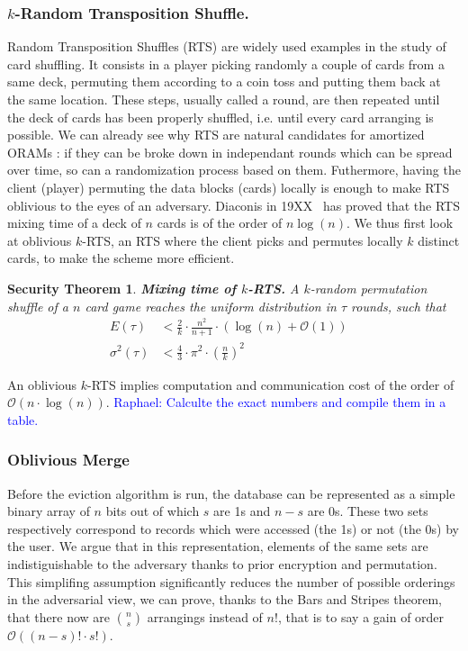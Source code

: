 \documentclass[conference]{IEEEtran}
\newtheorem{secthm}{Security Theorem}
\newcommand{\raphael}[1]{\textcolor{blue}{Raphael: #1}}
\begin{document}
\subsubsection{$k$-Random Transposition Shuffle.}
Random Transposition Shuffles (RTS) are widely used examples in the study of card shuffling. It consists in a player picking randomly a couple of cards from a same deck, permuting them according to a coin toss and putting them back at the same location.
These steps, usually called a round, are then repeated until the deck of cards has been properly shuffled, i.e. until every card arranging is possible.
We can already see why RTS are natural candidates for amortized ORAMs : if they can be broke down in independant rounds which can be spread over time, so can a randomization process based on them. Futhermore, having the client (player) permuting the data blocks (cards) locally is enough to make RTS oblivious to the eyes of an adversary.
Diaconis in 19XX~\cite{} has proved that the RTS mixing time of a deck of $n$ cards is of the order of $n\log(n)$. We thus first look at oblivious $k$-RTS, an RTS where the client picks and permutes locally $k$ distinct cards, to make the scheme more efficient.

\begin{secthm}
\textbf{Mixing time of $k$-RTS.} A $k$-random permutation shuffle of a $n$ card game reaches the uniform distribution in $\tau$ rounds, such that
\begin{align*}
E(\tau) &< \frac{2}{k}\cdot\frac{n^2}{n+1}\cdot \left ( \log(n) + \mathcal{O}(1) \right ) &\\
\sigma^2(\tau) &< \frac{4}{3} \cdot {\pi}^2 \cdot \left ( \frac{n}{k} \right )^2 &
\end{align*}
\end{secthm}

An oblivious $k$-RTS implies computation and communication cost of the order of $\mathcal{O} \left(n\cdot \log(n)\right)$.
\raphael{Calculte the exact numbers and compile them in a table.}

\subsubsection{Oblivious Merge}
Before the eviction algorithm is run, the database can be represented as a simple binary array of $n$ bits out of which $s$ are 1s and $n-s$ are 0s. These two sets respectively correspond to records which were accessed (the 1s) or not (the 0s) by the user.
We argue that in this representation, elements of the same sets are indistiguishable to the adversary thanks to prior encryption and permutation.
This simplifing assumption significantly reduces the number of possible orderings in the adversarial view, we can prove, thanks to the Bars and Stripes theorem, that there now are ${n \choose s}$ arrangings instead of $n!$, that is to say a gain of order $\mathcal{O}\left ( (n-s)!\cdot s!\right )$.
\end{document}
